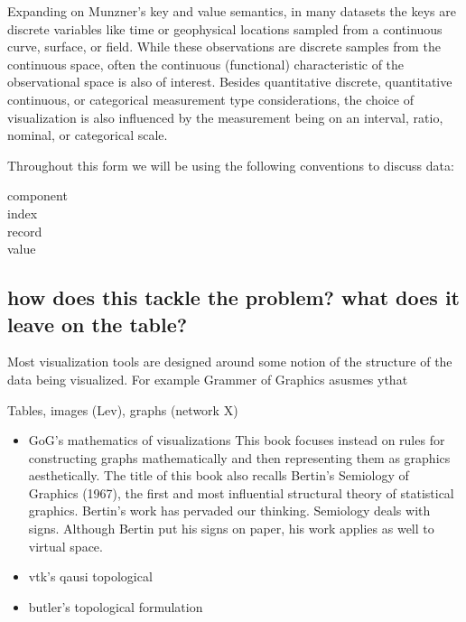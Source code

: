\documentclass[../main.tex]{subfiles}
\begin{document}
Expanding on Munzner's key and value semantics, in many datasets the keys are discrete variables like time or geophysical locations sampled from a continuous curve, surface, or field. While these observations are discrete samples from the continuous space, often the continuous (functional) characteristic\cite{ramsayFunctionalDataAnalysis2006a,mullerFunctionalVarianceProcesses2006a} of the observational space is also of interest. Besides quantitative discrete, quantitative continuous, or categorical measurement type considerations, the choice of visualization is also influenced by the measurement being on an interval, ratio, nominal, or categorical scale. 

Throughout this form we will be using the following conventions to discuss data:

\begin{description}
    \item[component]
    \item[index]  
    \item[record]
    \item[value]  
\end{description}

\subsection{how does this tackle the problem? what does it leave on the table?}
Most visualization tools are designed around some notion of the structure of the data being visualized. For example Grammer of Graphics asusmes ythat 

 
Tables, images (Lev), graphs (network X)

\begin{itemize}

    \item GoG's mathematics of visualizations
    This book focuses instead on rules for constructing graphs mathematically
and then representing them as graphics aesthetically.
The title of this book also recalls Bertin’s Semiology of Graphics (1967),
the first and most influential structural theory of statistical graphics. Bertin’s
work has pervaded our thinking. Semiology deals with signs. Although Bertin
put his signs on paper, his work applies as well to virtual space.
    \item vtk's qausi topological
    \item butler's topological formulation
\end{itemize}
\end{document}
